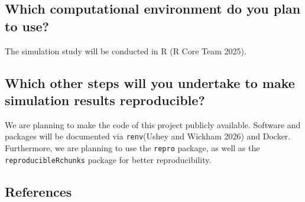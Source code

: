 \documentclass[
  man,
  floatsintext]{apa7}
\begin{document}
\subsection{Which computational environment do you plan to
use?}\label{which-computational-environment-do-you-plan-to-use}

The simulation study will be conducted in R (R Core Team 2025).

\subsection{Which other steps will you undertake to make simulation
results
reproducible?}\label{which-other-steps-will-you-undertake-to-make-simulation-results-reproducible}

We are planning to make the code of this project publicly available.
Software and packages will be documented via \texttt{renv}(Ushey and
Wickham 2026) and Docker. Furthermore, we are planning to use the
\texttt{repro} package, as well as the \texttt{reproducibleRchunks}
package for better reproducibility.

\pagebreak

\subsection*{References}\label{references}
\end{document}
